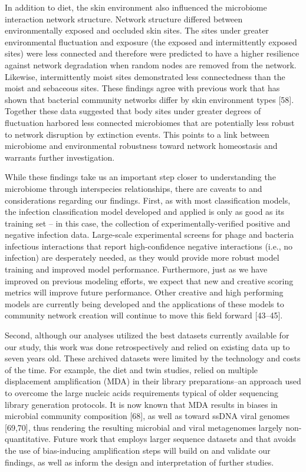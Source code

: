 \documentclass[12pt,]{article}
\begin{document}
In addition to diet, the skin environment also influenced the microbiome
interaction network structure. Network structure differed between
environmentally exposed and occluded skin sites. The sites under greater
environmental fluctuation and exposure (the exposed and intermittently
exposed sites) were less connected and therefore were predicted to have
a higher resilience against network degradation when random nodes are
removed from the network. Likewise, intermittently moist sites
demonstrated less connectedness than the moist and sebaceous sites.
These findings agree with previous work that has shown that bacterial
community networks differ by skin environment types {[}58{]}. Together
these data suggested that body sites under greater degrees of
fluctuation harbored less connected microbiomes that are potentially
less robust to network disruption by extinction events. This points to a
link between microbiome and environmental robustness toward network
homeostasis and warrants further investigation.

While these findings take us an important step closer to understanding
the microbiome through interspecies relationships, there are caveats to
and considerations regarding our findings. First, as with most
classification models, the infection classification model developed and
applied is only as good as its training set -- in this case, the
collection of experimentally-verified positive and negative infection
data. Large-scale experimental screens for phage and bacteria infectious
interactions that report high-confidence negative interactions (i.e., no
infection) are desperately needed, as they would provide more robust
model training and improved model performance. Furthermore, just as we
have improved on previous modeling efforts, we expect that new and
creative scoring metrics will improve future performance. Other creative
and high performing models are currently being developed and the
applications of these models to community network creation will continue
to move this field forward {[}43--45{]}.

Second, although our analyses utilized the best datasets currently
available for our study, this work was done retrospectively and relied
on existing data up to seven years old. These archived datasets were
limited by the technology and costs of the time. For example, the diet
and twin studies, relied on multiple displacement amplification (MDA) in
their library preparations--an approach used to overcome the large
nucleic acids requirements typical of older sequencing library
generation protocols. It is now known that MDA results in biases in
microbial community composition {[}68{]}, as well as toward ssDNA viral
genomes {[}69,70{]}, thus rendering the resulting microbial and viral
metagenomes largely non-quantitative. Future work that employs larger
sequence datasets and that avoids the use of bias-inducing amplification
steps will build on and validate our findings, as well as inform the
design and interpretation of further studies.
\end{document}
